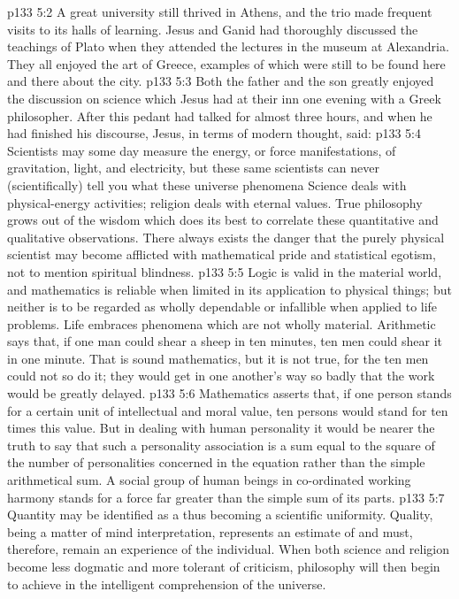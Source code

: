 \vs p133 5:2 A great university still thrived in Athens, and the trio made frequent visits to its halls of learning. Jesus and Ganid had thoroughly discussed the teachings of Plato when they attended the lectures in the museum at Alexandria. They all enjoyed the art of Greece, examples of which were still to be found here and there about the city.
\vs p133 5:3 Both the father and the son greatly enjoyed the discussion on science which Jesus had at their inn one evening with a Greek philosopher. After this pedant had talked for almost three hours, and when he had finished his discourse, Jesus, in terms of modern thought, said:
\vs p133 5:4 \pc Scientists may some day measure the energy, or force manifestations, of gravitation, light, and electricity, but these same scientists can never (scientifically) tell you what these universe phenomena  Science deals with physical\hyp{}energy activities; religion deals with eternal values. True philosophy grows out of the wisdom which does its best to correlate these quantitative and qualitative observations. There always exists the danger that the purely physical scientist may become afflicted with mathematical pride and statistical egotism, not to mention spiritual blindness.
\vs p133 5:5 Logic is valid in the material world, and mathematics is reliable when limited in its application to physical things; but neither is to be regarded as wholly dependable or infallible when applied to life problems. Life embraces phenomena which are not wholly material. Arithmetic says that, if one man could shear a sheep in ten minutes, ten men could shear it in one minute. That is sound mathematics, but it is not true, for the ten men could not so do it; they would get in one another’s way so badly that the work would be greatly delayed.
\vs p133 5:6 Mathematics asserts that, if one person stands for a certain unit of intellectual and moral value, ten persons would stand for ten times this value. But in dealing with human personality it would be nearer the truth to say that such a personality association is a sum equal to the square of the number of personalities concerned in the equation rather than the simple arithmetical sum. A social group of human beings in co\hyp{}ordinated working harmony stands for a force far greater than the simple sum of its parts.
\vs p133 5:7 Quantity may be identified as a  thus becoming a scientific uniformity. Quality, being a matter of mind interpretation, represents an estimate of  and must, therefore, remain an experience of the individual. When both science and religion become less dogmatic and more tolerant of criticism, philosophy will then begin to achieve  in the intelligent comprehension of the universe.
